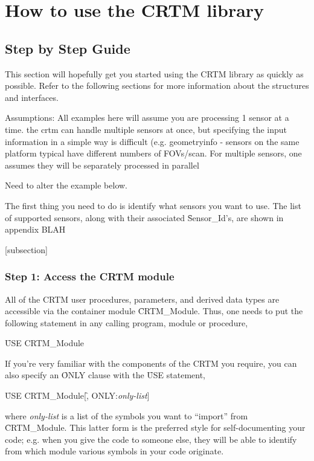 \chapter{How to use the CRTM library}
\section{Step by Step Guide}
This section will hopefully get you started using the CRTM library as quickly as possible. Refer to the following sections for more information about the structures and interfaces.

Assumptions:
All examples here will assume you are processing 1 sensor at a time. the crtm can handle multiple sensors at once, but specifying the input information in a simple way is difficult (e.g. geometryinfo - sensors on the same platform typical have different numbers of FOVs/scan. For multiple sensors, one assumes they will be separately processed in parallel


Need to alter the example below.

The first thing you need to do is identify what sensors you want to use. The list of supported sensors, along with their associated \f{Sensor\_Id}'s, are shown in appendix BLAH


[subsection]

\subsection{Step 1: Access the CRTM module}
All of the CRTM user procedures, parameters, and derived data types are accessible via the container module \f{CRTM\_Module}. Thus, one needs to put the following statement in any calling program, module or procedure,

\qquad\f{USE CRTM\_Module}

If you're very familiar with the components of the CRTM you require, you can also specify an \f{ONLY} clause with the \f{USE} statement,

\qquad\f{USE CRTM\_Module}[\f{, ONLY:}\textit{only-list}]

where \textit{only-list} is a list of the symbols you want to ``import'' from \f{CRTM\_Module}. This latter form is the preferred style for self-documenting your code; e.g. when you give the code to someone else, they will be able to identify from which module various symbols in your code originate.

